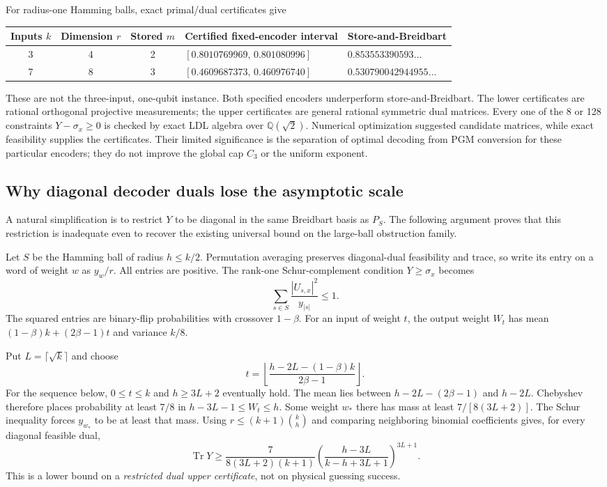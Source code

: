 \documentclass[11pt,a4paper]{article}
\newcommand{\Tr}{\operatorname{Tr}}
\begin{document}
For radius-one Hamming balls, exact primal/dual certificates give
\begin{center}
\begin{tabular}{@{}cccll@{}}
\toprule
Inputs $k$ & Dimension $r$ & Stored $m$ & Certified fixed-encoder interval & Store-and-Breidbart\\
\midrule
3 & 4 & 2 & $[0.8010769969,\,0.801080996]$ & $0.853553390593\ldots$\\
7 & 8 & 3 & $[0.4609687373,\,0.460976740]$ & $0.530790042944955\ldots$\\
\bottomrule
\end{tabular}
\end{center}
These are not the three-input, one-qubit instance. Both specified encoders underperform store-and-Breidbart. The lower certificates are rational orthogonal projective measurements; the upper certificates are general rational symmetric dual matrices. Every one of the 8 or 128 constraints $Y-\sigma_x\ge0$ is checked by exact LDL algebra over $\mathbb Q(\sqrt2)$. Numerical optimization suggested candidate matrices, while exact feasibility supplies the certificates. Their limited significance is the separation of optimal decoding from PGM conversion for these particular encoders; they do not improve the global cap $C_3$ or the uniform exponent.

\subsection{Why diagonal decoder duals lose the asymptotic scale}
A natural simplification is to restrict $Y$ to be diagonal in the same Breidbart basis as $P_S$. The following argument proves that this restriction is inadequate even to recover the existing universal bound on the large-ball obstruction family.

Let $S$ be the Hamming ball of radius $h\le k/2$. Permutation averaging preserves diagonal-dual feasibility and trace, so write its entry on a word of weight $w$ as $y_w/r$. All entries are positive. The rank-one Schur-complement condition $Y\ge\sigma_x$ becomes
\[
\sum_{s\in S}\frac{|U_{s,x}|^2}{y_{|s|}}\le1.
\]
The squared entries are binary-flip probabilities with crossover $1-\beta$. For an input of weight $t$, the output weight $W_t$ has mean $(1-\beta)k+(2\beta-1)t$ and variance $k/8$.

Put $L=\lceil\sqrt k\rceil$ and choose
\[
t=\left\lfloor\frac{h-2L-(1-\beta)k}{2\beta-1}\right\rfloor.
\]
For the sequence below, $0\le t\le k$ and $h\ge3L+2$ eventually hold. The mean lies between $h-2L-(2\beta-1)$ and $h-2L$. Chebyshev therefore places probability at least $7/8$ in $h-3L-1\le W_t\le h$. Some weight $w_*$ there has mass at least $7/[8(3L+2)]$. The Schur inequality forces $y_{w_*}$ to be at least that mass. Using $r\le(k+1)\binom{k}{h}$ and comparing neighboring binomial coefficients gives, for every diagonal feasible dual,
\[
\Tr Y\ge\frac{7}{8(3L+2)(k+1)}
\left(\frac{h-3L}{k-h+3L+1}\right)^{3L+1}.
\]
This is a lower bound on a \emph{restricted dual upper certificate}, not on physical guessing success.
\end{document}
